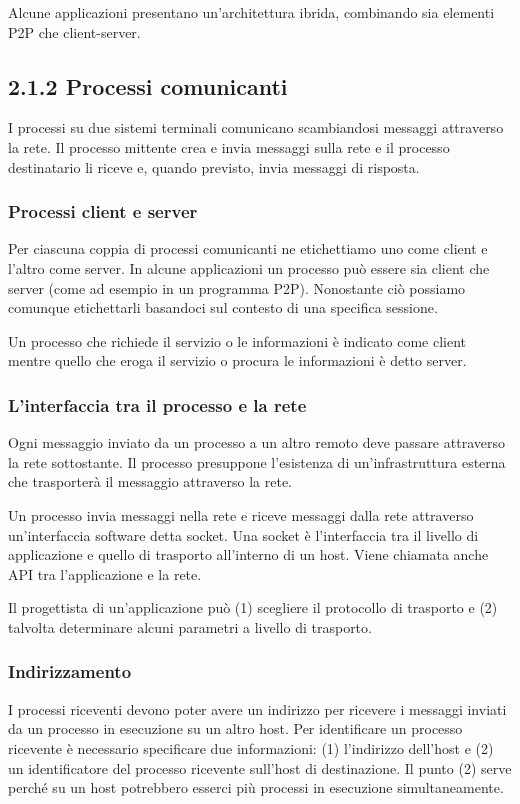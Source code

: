\documentclass{book}
\begin{document}
Alcune applicazioni presentano un'architettura ibrida, combinando sia elementi P2P che client-server.

\subsection*{2.1.2 Processi comunicanti}
I processi su due sistemi terminali comunicano scambiandosi messaggi attraverso la rete. Il processo mittente crea e invia messaggi sulla rete e il processo destinatario li riceve e, quando previsto, invia messaggi di risposta.

\subsubsection*{Processi client e server}
Per ciascuna coppia di processi comunicanti ne etichettiamo uno come client e l'altro come server. In alcune applicazioni un processo può essere sia client che server (come ad esempio in un programma P2P). Nonostante ciò possiamo comunque etichettarli basandoci sul contesto di una specifica sessione.

Un processo che richiede il servizio o le informazioni è indicato come client mentre quello che eroga il servizio o procura le informazioni è detto server.

\subsubsection*{L'interfaccia tra il processo e la rete}
Ogni messaggio inviato da un processo a un altro remoto deve passare attraverso la rete sottostante. Il processo presuppone l'esistenza di un'infrastruttura esterna che trasporterà il messaggio attraverso la rete.

Un processo invia messaggi nella rete e riceve messaggi dalla rete attraverso un'interfaccia software detta socket. Una socket è l'interfaccia tra il livello di applicazione e quello di trasporto all'interno di un host. Viene chiamata anche API tra l'applicazione e la rete.

Il progettista di un'applicazione può (1) scegliere il protocollo di trasporto e (2) talvolta determinare alcuni parametri a livello di trasporto.

\subsubsection*{Indirizzamento}
I processi riceventi devono poter avere un indirizzo per ricevere i messaggi inviati da un processo in esecuzione su un altro host. Per identificare un processo ricevente è necessario specificare due informazioni: (1) l'indirizzo dell'host e (2) un identificatore del processo ricevente sull'host di destinazione. Il punto (2) serve perché su un host potrebbero esserci più processi in esecuzione simultaneamente.
\end{document}

